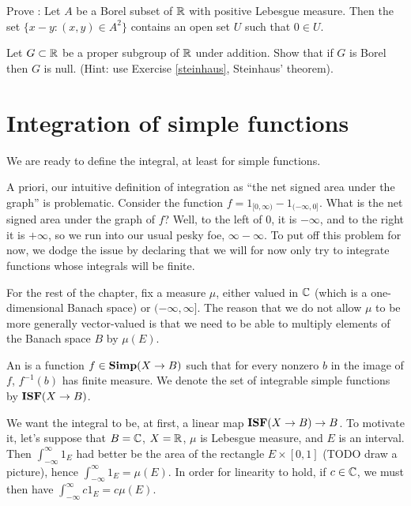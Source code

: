\begin{exercise}
\label{steinhaus}
Prove : Let $A$ be a Borel subset of $\mathbb{R}$ with positive Lebesgue measure. Then the set $\{x - y: (x, y) \in A^2\}$ contains an open set $U$ such that $0 \in U$.
\end{exercise}

\begin{exercise}
Let $G \subset \mathbb{R}$ be a proper subgroup of $\mathbb{R}$ under addition.
Show that if $G$ is Borel then $G$ is null.
(Hint: use Exercise \ref{steinhaus}, Steinhaus' theorem).
\end{exercise}


\section{Integration of simple functions}
We are ready to define the integral, at least for simple functions.

\begin{subsec}
A priori, our intuitive definition of integration as ``the net signed area under the graph'' is problematic.
Consider the function $f = 1_{[0, \infty)} - 1_{(-\infty, 0]}$. What is the net signed area under the graph of $f$? Well, to the left of $0$, it is $-\infty$, and to the right it is $+\infty$, so we run into our usual pesky foe, $\infty - \infty$.
To put off this problem for now, we dodge the issue by declaring that we will for now only try to integrate functions whose integrals will be finite.
\end{subsec}

\begin{subsec}
For the rest of the chapter, fix a measure $\mu$, either valued in $\mathbb{C}$ (which is a one-dimensional Banach space) or $(-\infty, \infty]$.
The reason that we do not allow $\mu$ to be more generally vector-valued is that we need to be able to multiply elements of the Banach space $B$ by $\mu(E)$.
\end{subsec}

\begin{definition}
An  is a function $f \in \mathbf{Simp}(X \to B)$ such that for every nonzero $b$ in the image of $f$, $f^{-1}(b)$ has finite measure.
We denote the set of integrable simple functions by $\mathbf{ISF}(X \to B)$.
\end{definition}

\begin{subsec}
We want the integral to be, at first, a linear map $\mathbf{ISF}(X \to B) \to B$.
To motivate it, let's suppose that $B = \mathbb{C}$, $X = \mathbb{R}$, $\mu$ is Lebesgue measure, and $E$ is an interval. Then $\int_{-\infty}^{\infty} 1_E$ had better be the area of the rectangle $E \times [0, 1]$ (TODO draw a picture), hence $\int_{-\infty}^{\infty} 1_{E} = \mu(E)$. In order for linearity to hold, if $c \in \mathbb{C}$, we must then have $\int_{-\infty}^{\infty} c1_{E} = c\mu(E)$.
\end{subsec}

